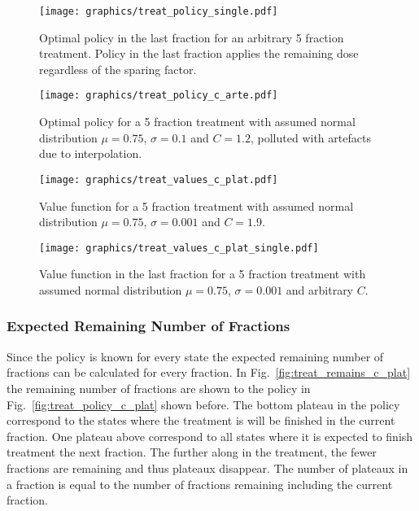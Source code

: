 \documentclass[\relativeRoot/ada.tex]{subfiles}
\begin{document}
\begin{figure}[!htb]
    \centering
    \texttt{[image: graphics/treat\_policy\_single.pdf]}
    \caption{Optimal policy in the last fraction for an arbitrary 5 fraction treatment. Policy in the last fraction applies the remaining dose regardless of the sparing factor.}
    \label{fig:treat_policy_single}
\end{figure}

\begin{figure}[!htb]
    \centering
    \texttt{[image: graphics/treat\_policy\_c\_arte.pdf]}
    \caption{Optimal policy for a 5 fraction treatment with assumed normal distribution $\mu=0.75$, $\sigma=0.1$ and $C=1.2$, polluted with artefacts due to interpolation.}
    \label{fig:treat_policy_c_arte}
\end{figure}

\begin{figure}[!htb]
    \centering
    \texttt{[image: graphics/treat\_values\_c\_plat.pdf]}
    \caption{Value function for a 5 fraction treatment with assumed normal distribution $\mu=0.75$, $\sigma=0.001$ and $C=1.9$.}
    \label{fig:treat_values_c_plat}
\end{figure}

\begin{figure}[!htb]
    \centering
    \texttt{[image: graphics/treat\_values\_c\_plat\_single.pdf]}
    \caption{Value function in the last fraction for a 5 fraction treatment with assumed normal distribution $\mu=0.75$, $\sigma=0.001$ and arbitrary $C$.}
    \label{fig:treat_values_c_plat_single}
\end{figure}

\subsubsection{Expected Remaining Number of Fractions}

Since the policy is known for every state the expected remaining number of fractions can be calculated for every fraction. In Fig.~\ref{fig:treat_remains_c_plat} the remaining number of fractions are shown to the policy in Fig.~\ref{fig:treat_policy_c_plat} shown before. The bottom plateau in the policy correspond to the states where the treatment is will be finished in the current fraction. One plateau above correspond to all states where it is expected to finish treatment the next fraction. The further along in the treatment, the fewer fractions are remaining and thus plateaux disappear. The number of plateaux in a fraction is equal to the number of fractions remaining including the current fraction.
\end{document}
